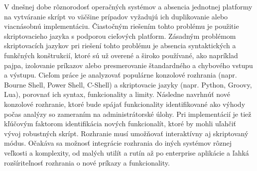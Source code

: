 \indent V dnešnej dobe rôznorodosť operačných systémov a absencia jednotnej platformy na vytváranie skrípt vo väčšine prípadov vyžadujú ich duplikovanie alebo viacnásobnú implementáciu. Čiastočným riešením tohto problému je použitie skriptovacieho jazyka s podporou cieľových platform. Zásadným problémom skriptovacích jazykov pri riešení tohto problému je absencia syntaktických a funkčných konštrukcií, ktoré sú už overené a široko používané, ako napríklad pajpa, izolovanie príkazov alebo presmerovanie štandardného a chybového vstupu a výstupu. Cieľom práce je analyzovať populárne konzolové rozhrania (napr. Bourne Shell, Power Shell, C-Shell) a skriptovacie jazyky (napr. Python, Groovy, Lua), porovnať ich syntax, funkcionality a limity. Následne navrhnúť nové konzolové rozhranie, ktoré bude spájať funkcionality identifikované ako výhody počas analýzy so zameraním na administrátorské úlohy. Pri implementácií je tiež kľúčovým faktorom identifikácia nových funkcionalít, ktoré by mohli uľahčiť vývoj robustných skrípt. Rozhranie musí umožňovať interaktívny aj skriptovaný módus. Očakáva sa možnosť integrácie rozhrania do iných systémov rôznej veľkosti a komplexity, od malých utilít a rutín až po enterprise aplikácie a ľahká rozšíriteľnosť rozhrania o nové príkazy a funkcionality.